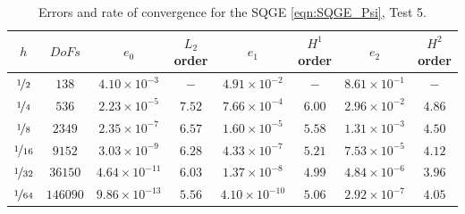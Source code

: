 \begin{table}%
\begin{center}
\begin{tabular}{|c|c|c|c|c|c|c|c|}%
  \hline
  $h$ & $DoFs$ & $e_0$ & $L_2$ order & $e_1$ & $H^1$ order & $e_2$ & $H^2$ order \\[0.2em] %
  \hline
  $\nicefrac{1}{2}$ & $138$ & $4.10\times 10^{-3}$ & $-$ & $4.91\times 10^{-2}$ & $-$ & $8.61\times 10^{-1}$ & $-$\\
  $\nicefrac{1}{4}$ & $536$ & $2.23\times 10^{-5}$ & $7.52$ & $7.66\times 10^{-4}$ & $6.00$ & $2.96\times 10^{-2}$ & $4.86$\\
  $\nicefrac{1}{8}$ & $2349$ & $2.35\times 10^{-7}$ & $6.57$ & $1.60\times 10^{-5}$ & $5.58$ & $1.31\times 10^{-3}$ & $4.50$\\
  $\nicefrac{1}{16}$ & $9152$ & $3.03\times 10^{-9}$ & $6.28$ & $4.33\times 10^{-7}$ & $5.21$ & $7.53\times 10^{-5}$ & $4.12$\\
  $\nicefrac{1}{32}$ & $36150$ & $4.64\times 10^{-11}$ & $6.03$ & $1.37\times 10^{-8}$ & $4.99$ & $4.84\times 10^{-6}$ & $3.96$\\
  $\nicefrac{1}{64}$ & $146090$ & $9.86\times 10^{-13}$ & $5.56$ & $4.10\times
  10^{-10}$ & $5.06$ & $2.92\times 10^{-7}$ & $4.05$ \\[0.2em]
 \hline
\end{tabular}
\end{center}
\caption{Errors and rate of convergence for the SQGE \eqref{eqn:SQGE_Psi}, Test 5.}
\label{tab:SQGEsinErrors}
\end{table}

